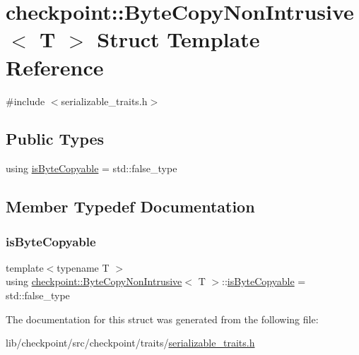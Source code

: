 \hypertarget{structcheckpoint_1_1_byte_copy_non_intrusive}{}\section{checkpoint\+:\+:Byte\+Copy\+Non\+Intrusive$<$ T $>$ Struct Template Reference}
\label{structcheckpoint_1_1_byte_copy_non_intrusive}


{\ttfamily \#include $<$serializable\+\_\+traits.\+h$>$}

\subsection*{Public Types}
\begin{DoxyCompactItemize}
\item 
using \hyperlink{structcheckpoint_1_1_byte_copy_non_intrusive_a8f9de16b0505586554da83a2613c0300}{is\+Byte\+Copyable} = std\+::false\+\_\+type
\end{DoxyCompactItemize}


\subsection{Member Typedef Documentation}
\mbox{\label{structcheckpoint_1_1_byte_copy_non_intrusive_a8f9de16b0505586554da83a2613c0300}} 
\subsubsection{\texorpdfstring{is\+Byte\+Copyable}{isByteCopyable}}
{\footnotesize\ttfamily template$<$typename T $>$ \\
using \hyperlink{structcheckpoint_1_1_byte_copy_non_intrusive}{checkpoint\+::\+Byte\+Copy\+Non\+Intrusive}$<$ T $>$\+::\hyperlink{structcheckpoint_1_1_byte_copy_non_intrusive_a8f9de16b0505586554da83a2613c0300}{is\+Byte\+Copyable} =  std\+::false\+\_\+type}



The documentation for this struct was generated from the following file\+:\begin{DoxyCompactItemize}
\item 
lib/checkpoint/src/checkpoint/traits/\hyperlink{serializable__traits_8h}{serializable\+\_\+traits.\+h}\end{DoxyCompactItemize}
